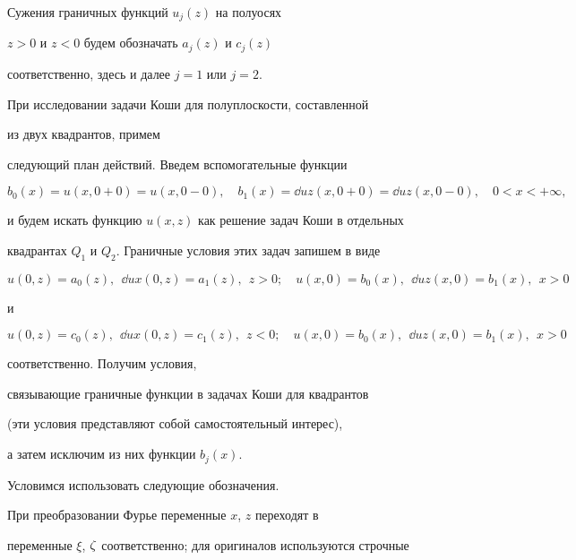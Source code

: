 Сужения граничных функций $u_j(z)$ на полуосях


$z>0$ и $z<0$ будем обозначать $a_j(z)$ и $c_j(z)$


соответственно, здесь и далее $j=1$ или $j=2$.





При исследовании задачи Коши для полуплоскости, составленной


из двух квадрантов, примем


следующий план действий. Введем вспомогательные функции


$$


b_0(x) = u(x,0+0)=u(x,0-0),\quad b_1(x) = \dd{u}{z}(x,0+0)=\dd{u}{z}(x,0-0),


\quad 0<x<+\infty,


$$


и будем искать функцию $u(x,z)$ как решение задач Коши в отдельных


квадрантах $Q_1$ и $Q_2$. Граничные условия этих задач запишем в виде


\begin{equation}\label{1.5}


u(0,z)=a_0(z),\ \ \dd{u}{x}(0,z)=a_1(z),\ \ z>0;\quad


u(x,0)=b_0(x),\ \ \dd{u}{z}(x,0)=b_1(x),\ \ x>0


\end{equation}


и


\begin{equation}\label{1.6}


u(0,z)=c_0(z),\ \ \dd{u}{x}(0,z)=c_1(z),\ \ z<0;\quad


u(x,0)=b_0(x),\ \ \dd{u}{z}(x,0)=b_1(x),\ \ x>0


\end{equation}


соответственно. Получим условия,


связывающие граничные функции в задачах Коши для квадрантов


(эти условия представляют собой самостоятельный интерес),


а затем исключим из них функции $b_j(x)$.





Условимся использовать следующие обозначения.


При преобразовании Фурье переменные $x$, $z$ переходят в


переменные $\xi$, $\zeta$ соответственно; для оригиналов используются строчные


